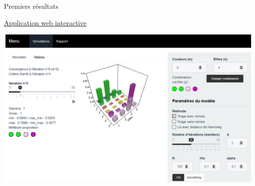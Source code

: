 \documentclass[10pt,xcolor=table,color={dvipsnames,usenames},ignorenonframetext,usepdftitle=false,french]{beamer}
\begin{document}
\begin{frame}{Premiers résultats}
\protect\hypertarget{premiers-ruxe9sultats}{}

\href{https://antuki.shinyapps.io/mastermind}{Application web
interactive}

\href{https://antuki.shinyapps.io/mastermind}{\includegraphics{img/appli.png}}

\end{frame}
\end{document}
